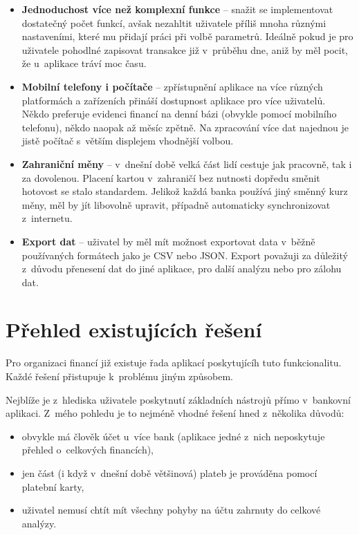 \documentclass[
  biblatex,
  figures=true,
  tables=false,
  glossaries,
  index
]{kidiplom}
\begin{document}
\begin{itemize}
  \item \textbf{Jednoduchost více než komplexní funkce} -- snažit se implementovat dostatečný počet funkcí, avšak nezahltit uživatele příliš mnoha různými nastaveními, které mu přidají práci při volbě parametrů. Ideálně pokud je pro uživatele pohodlné zapisovat transakce již v~průběhu dne, aniž by měl pocit, že u~aplikace tráví moc času.
  \item \textbf{Mobilní telefony i počítače} -- zpřístupnění aplikace na více různých platformách a zařízeních přináší dostupnost aplikace pro více uživatelů. Někdo preferuje evidenci financí na denní bázi (obvykle pomocí mobilního telefonu), někdo naopak až měsíc zpětně. Na zpracování více dat najednou je jistě počítač s~větším displejem vhodnější volbou.
  \item \textbf{Zahraniční měny} -- v~dnešní době velká část lidí cestuje jak pracovně, tak i za dovolenou. Placení kartou v~zahraničí bez nutnosti dopředu směnit hotovost se stalo standardem. Jelikož každá banka používá jiný směnný kurz měny, měl by jít libovolně upravit, případně automaticky synchronizovat z~internetu.
  \item \textbf{Export dat} -- uživatel by měl mít možnost exportovat data v~běžně používaných formátech jako je CSV nebo JSON. Export považuji za důležitý z~důvodu přenesení dat do jiné aplikace, pro další analýzu nebo pro zálohu dat.
\end{itemize}

\section{Přehled existujících řešení}
Pro organizaci financí již existuje řada aplikací poskytujícíh tuto funkcionalitu. Každé řešení přistupuje k~problému jiným způsobem. 

Nejblíže je z~hlediska uživatele poskytnutí základních nástrojů přímo v~bankovní aplikaci. Z~mého pohledu je to nejméně vhodné řešení hned z~několika důvodů:
\begin{itemize}
  \item obvykle má člověk účet u~více bank (aplikace jedné z~nich neposkytuje přehled o~celkových financích),
  \item jen část (i když v~dnešní době většinová) plateb je prováděna pomocí platební karty,
  \item uživatel nemusí chtít mít všechny pohyby na účtu zahrnuty do celkové analýzy.
\end{itemize}
\end{document}
